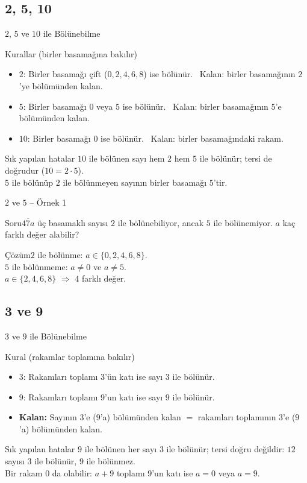 \documentclass[aspectratio=169,11pt,handout]{beamer}
\newcommand{\soru}[3]{%
\begin{frame}{#1}
  \begin{block}{Soru}\large #2\end{block}
  \pause
  \begin{exampleblock}{Çözüm}\large #3\end{exampleblock}
\end{frame}}
\newcommand{\ab}[1]{\overline{#1}}
\begin{document}
\subsection{2, 5, 10}
\begin{frame}{\(2\), \(5\) ve \(10\) ile Bölünebilme}
\begin{block}{Kurallar (birler basamağına bakılır)}
\begin{itemize}
\item \(2\): Birler basamağı çift (\(0,2,4,6,8\)) ise bölünür. \ Kalan: birler basamağının \(2\)'ye bölümünden kalan.
\item \(5\): Birler basamağı \(0\) veya \(5\) ise bölünür. \ Kalan: birler basamağının \(5\)'e bölümünden kalan.
\item \(10\): Birler basamağı \(0\) ise bölünür. \ Kalan: birler basamağındaki rakam.
\end{itemize}
\end{block}
\begin{alertblock}{Sık yapılan hatalar}
\(10\) ile bölünen sayı hem \(2\) hem \(5\) ile bölünür; tersi de doğrudur (\(10=2\cdot 5\)).\\
\(5\) ile bölünüp \(2\) ile bölünmeyen sayının birler basamağı \(5\)'tir.
\end{alertblock}
\end{frame}

\soru{\(2\) ve \(5\) -- Örnek 1}
{\(\ab{47a}\) üç basamaklı sayısı \(2\) ile bölünebiliyor, ancak \(5\) ile bölünemiyor. \(a\) kaç farklı değer alabilir?}
{\(2\) ile bölünme: \(a\in\{0,2,4,6,8\}\).\\[3pt]
\(5\) ile bölünmeme: \(a\neq 0\) ve \(a\neq 5\).\\[3pt]
\(a\in\{2,4,6,8\}\) \(\Rightarrow\) \(4\) farklı değer.}

\subsection{3 ve 9}
\begin{frame}{\(3\) ve \(9\) ile Bölünebilme}
\begin{block}{Kural (rakamlar toplamına bakılır)}
\begin{itemize}
\item \(3\): Rakamları toplamı \(3\)'ün katı ise sayı \(3\) ile bölünür.
\item \(9\): Rakamları toplamı \(9\)'un katı ise sayı \(9\) ile bölünür.
\item \textbf{Kalan:} Sayının \(3\)'e (\(9\)'a) bölümünden kalan \(=\) rakamları toplamının \(3\)'e (\(9\)'a) bölümünden kalan.
\end{itemize}
\end{block}
\begin{alertblock}{Sık yapılan hatalar}
\(9\) ile bölünen her sayı \(3\) ile bölünür; tersi doğru değildir: \(12\) sayısı \(3\) ile bölünür, \(9\) ile bölünmez.\\
Bir rakam \(0\) da olabilir: \(a+9\) toplamı \(9\)'un katı ise \(a=0\) veya \(a=9\).
\end{alertblock}
\end{frame}
\end{document}
